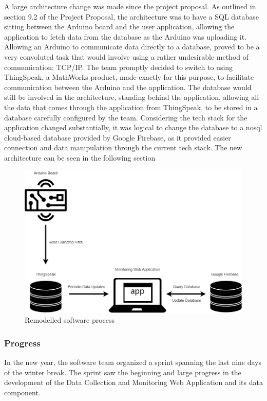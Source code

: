 A large architecture change was made since the project proposal. As outlined in section 9.2 of the Project Proposal, the architecture was to have a SQL database sitting between the Arduino board and the user application, allowing the application to fetch data from the database as the Arduino was uploading it. Allowing an Arduino to communicate data directly to a database, proved to be a very convoluted task that would involve using a rather undesirable method of communication: TCP/IP. The team promptly decided to switch to using ThingSpeak, a MathWorks product, made exactly for this purpose, to facilitate communication between the Arduino and the application. The database would still be involved in the architecture, standing behind the application, allowing all the data that comes through the application from ThingSpeak, to be stored in a database carefully configured by the team. Considering the tech stack for the application changed substantially, it was logical to change the database to a nosql cloud-based database provided by Google Firebase, as it provided easier connection and data manipulation through the current tech stack. The new architecture can be seen in the following section
\begin{figure}[H]
\centering
\includegraphics[width =\textwidth]{Progress_Report/figs/CapstoneDiagrams-Page-2.drawio (1).png}
\caption{Remodelled software process}
\label{fig:ThingSpeak}
\end{figure}
\par
\subsubsection{Progress}
In the new year, the software team organized a sprint spanning the last nine days of the winter break. The sprint saw the beginning and large progress in the development of the Data Collection and Monitoring Web Application and its data component. 

